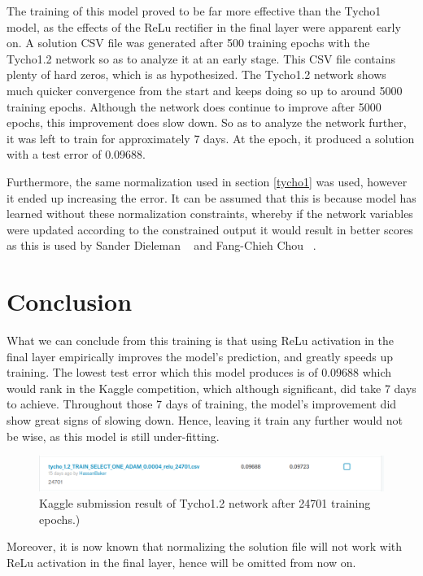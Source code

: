 \documentclass[12pt,a4paper,oneside,oldfontcommands]{memoir}
\begin{document}
\begin{Declaration Of OriginalityOrginality}
The training of this model proved to be far more effective than the Tycho1 model, as the effects of the ReLu rectifier in the final layer were apparent early on. A solution CSV file was generated after 500 training epochs with the Tycho1.2 network so as to analyze it at an early stage. This CSV file contains plenty of hard zeros, which is as hypothesized. The Tycho1.2 network shows much quicker convergence from the start and keeps doing so up to around 5000 training epochs. Although the network does continue to improve after 5000 epochs, this improvement does slow down. So as to analyze the network further, it was left to train for approximately 7 days. At the  epoch, it produced a solution with a test error of 0.09688.

Furthermore, the same normalization used in section \ref{tycho1} was used, however it ended up increasing the error. It can be assumed that this is because model has learned without these normalization constraints, whereby if the network variables were updated according to the constrained output it would result in better scores as this is used by Sander Dieleman ~\cite{Sanders-GZ} and Fang-Chieh Chou ~\cite{Fang}.

\section{Conclusion}

What we can conclude from this training is that using ReLu activation in the final layer empirically improves the model's prediction, and greatly speeds up training. The lowest test error which this model produces is of \(0.09688\) which would rank  in the Kaggle competition, which although significant, did take 7 days to achieve. Throughout those 7 days of training, the model's improvement did show great signs of slowing down. Hence, leaving it train any further would not be wise, as this model is still under-fitting. 

\begin{figure}[H]
  \centering
    \includegraphics[width=\linewidth]{images/tycho12_result.png}
    \caption{Kaggle submission result of Tycho1.2 network after 24701 training epochs.)}
   \label{fig:tycho-12-solution}
\end{figure}

Moreover, it is now known that normalizing the solution file will not work with ReLu activation in the final layer, hence will be omitted from now on.



\end{Declaration Of OriginalityOrginality}
\end{document}
